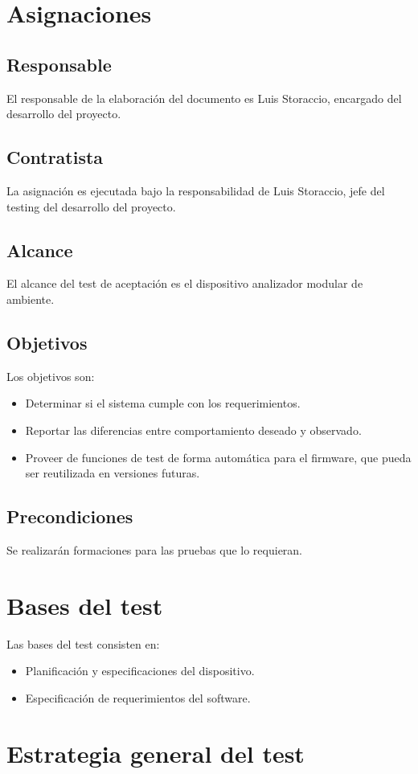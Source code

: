 \documentclass[
11pt, %
]{charter}
\begin{document}
\section{Asignaciones}

\subsection{Responsable}
El responsable de la elaboración del documento es Luis Storaccio, encargado del
desarrollo del proyecto.
\subsection{Contratista}
La asignación es ejecutada bajo la responsabilidad de Luis Storaccio, jefe del
testing del desarrollo del proyecto.
\subsection{Alcance}
El alcance del test de aceptación es el dispositivo analizador modular de
ambiente.
\subsection{Objetivos}
Los objetivos son:
\begin{itemize}
    \item Determinar si el sistema cumple con los requerimientos.
    \item Reportar las diferencias entre comportamiento deseado y observado.
    \item Proveer de funciones de test de forma automática para el firmware,
          que
          pueda ser reutilizada en versiones futuras.
\end{itemize}
\subsection{Precondiciones}
Se realizarán formaciones para las pruebas que lo requieran.
\section{Bases del test}
Las bases del test consisten en:
\begin{itemize}
    \item Planificación y especificaciones del dispositivo.
    \item Especificación de requerimientos del software.
\end{itemize}
\section{Estrategia general del test}
\end{document}
